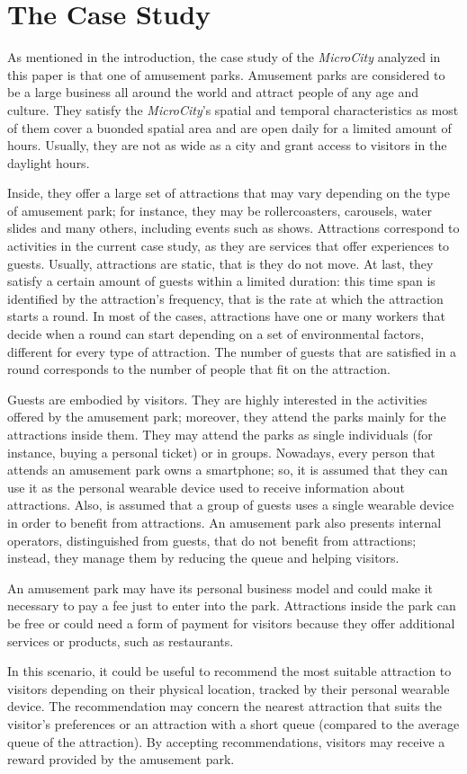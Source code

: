 \section{The Case Study}
\label{sec:case}

As mentioned in the introduction, the case study of the \textit{MicroCity} analyzed in this paper is that one of amusement parks. Amusement parks are considered to be a large business all around the world and attract people of any age and culture. They satisfy the \textit{MicroCity}'s spatial and temporal characteristics as most of them cover a buonded spatial area and are open daily for a limited amount of hours. Usually, they are not as wide as a city and grant access to visitors in the daylight hours.

Inside, they offer a large set of attractions that may vary depending on the type of amusement park; for instance, they may be rollercoasters, carousels, water slides and many others, including events such as shows. Attractions correspond to activities in the current case study, as they are services that offer experiences to guests. Usually, attractions are static, that is they do not move. At last, they satisfy a certain amount of guests within a limited duration: this time span is identified by the attraction's frequency, that is the rate at which the attraction starts a round. In most of the cases, attractions have one or many workers that decide when a round can start depending on a set of environmental factors, different for every type of attraction. The number of guests that are satisfied in a round corresponds to the number of people that fit on the attraction.

Guests are embodied by visitors. They are highly interested in the activities offered by the amusement park; moreover, they attend the parks mainly for the attractions inside them. They may attend the parks as single individuals (for instance, buying a personal ticket) or in groups. Nowadays, every person that attends an amusement park owns a smartphone; so, it is assumed that they can use it as the personal wearable device used to receive information about attractions. Also, is assumed that a group of guests uses a single wearable device in order to benefit from attractions. An amusement park also presents internal operators, distinguished from guests, that do not benefit from attractions; instead, they manage them by reducing the queue and helping visitors.

An amusement park may have its personal business model and could make it necessary to pay a fee just to enter into the park. Attractions inside the park can be free or could need a form of payment for visitors because they offer additional services or products, such as restaurants.

In this scenario, it could be useful to recommend the most suitable attraction to visitors depending on their physical location, tracked by their personal wearable device. The recommendation may concern the nearest attraction that suits the visitor's preferences or an attraction with a short queue (compared to the average queue of the attraction). By accepting recommendations, visitors may receive a reward provided by the amusement park.